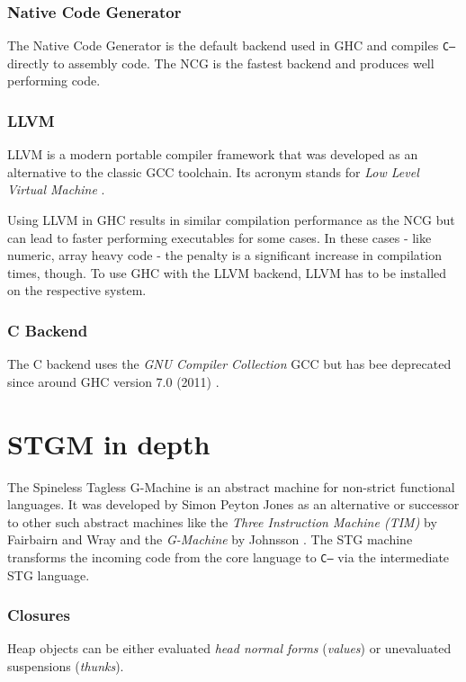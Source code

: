 \documentclass[runningheads]{llncs}
\begin{document}
\subsubsection{Native Code Generator}
The Native Code Generator is the default backend used in GHC and compiles \texttt{C--} directly to assembly code. The NCG is the fastest backend and produces well performing code. \cite{GHCmanual}

\subsubsection{LLVM}
LLVM is a modern portable compiler framework that was developed as an alternative to the classic GCC toolchain. Its acronym stands for \textit{Low Level Virtual Machine} \cite{lattner2004llvm}.

Using LLVM in GHC results in similar compilation performance as the NCG but can lead to faster performing executables for some cases. In these cases - like numeric, array heavy code - the penalty is a significant increase in compilation times, though. To use GHC with the LLVM backend, LLVM has to be installed on the respective system.\cite{GHCmanual}

\subsubsection{C Backend}
The C backend uses the \textit{GNU Compiler Collection} GCC but has bee deprecated since around GHC version 7.0 (2011) \cite{GHCmanual}.





\section{STGM in depth}
\label{sec:stgm}

The Spineless Tagless G-Machine is an abstract machine for non-strict functional languages.
It was developed by Simon Peyton Jones as an alternative or successor to other such abstract machines like the \textit{Three Instruction Machine (TIM)} by Fairbairn and Wray \cite{fairbairn1987tim} and the \textit{G-Machine} by Johnsson \cite{johnsson1984efficient}.
The STG machine transforms the incoming code from the core language to \texttt{C--} via the intermediate STG language.






\subsubsection{Closures}
Heap objects can be either evaluated \textit{head normal forms} (\textit{values}) or unevaluated suspensions (\textit{thunks}).
\end{document}
